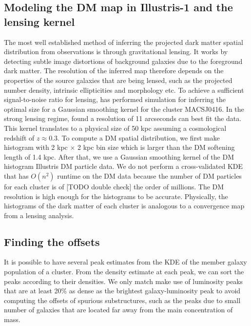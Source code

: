 \subsection{Modeling the DM map in Illustris-1 and the lensing kernel}
The most well established method of inferring the projected dark matter spatial 
distribution from observations is through gravitational lensing.
It works by detecting subtle image distortions of background galaxies due to
the foreground dark matter. The resolution of the inferred map therefore 
depends on the properties of the source galaxies that are being lensed, 
such as the projected number density, 
intrinsic ellipticities and morphology etc.
To achieve a sufficient signal-to-noise ratio for lensing, 
\citealt{Hoag2016}  has performed simulation for inferring the optimal size
for a Gaussian smoothing kernel for the cluster MACSJ0416. 
In the strong lensing regime, \cite{Hoag2016} found a resolution of 11 arcseconds
can best fit the data. This kernel translates to a physical size of 50 
kpc assuming a cosmological redshift of $z \approx 0.3$.
To compute a DM spatial distribution, we first make histogram with 2 kpc
$\times$ 2 kpc bin size which is larger than the DM softening length of 1.4 kpc. 
After that, we use a Gaussian smoothing kernel of the DM histogram Illustris DM
particle data. We do not perform a cross-validated KDE that has
$O(n^2)$ runtime on the DM data because the
number of DM particles for each cluster is of 
[TODO double check] the order of millions. The DM
resolution is high enough for the histograms to be accurate.  
Physically, the histograms of the dark matter of each cluster 
is analogous to a convergence map from a lensing analysis. 


\subsection{Finding the offsets} \label{subsec:offsets}
It is possible to have several peak estimates from the KDE of the member galaxy 
population of a cluster. 
From the density estimate at each peak, we can sort 
the peaks according to their densities. We only match make use of luminosity 
peaks that are at 
least 20\% as dense as the brightest galaxy-luminosity peak to avoid 
computing the offsets of spurious substructures, such as the peaks due to 
small number of galaxies that are located far away from the main concentration of mass.

